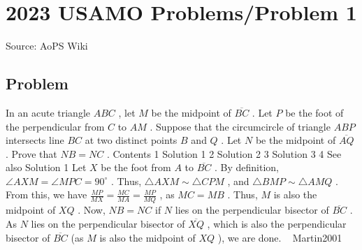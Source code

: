 \documentclass[12pt]{article}
\begin{document}
\section*{{2023 USAMO Problems/Problem 1}}
Source: AoPS Wiki

\subsection*{Problem}
In an acute triangle $ABC$ , let $M$ be the midpoint of $\overline{BC}$ . Let $P$ be the foot of the perpendicular from $C$ to $AM$ . Suppose that the circumcircle of triangle $ABP$ intersects line $BC$ at two distinct points $B$ and $Q$ . Let $N$ be the midpoint of $\overline{AQ}$ . Prove that $NB=NC$ . Contents 1 Solution 1 2 Solution 2 3 Solution 3 4 See also Solution 1 Let $X$ be the foot from $A$ to $\overline{BC}$ . By definition, $\angle AXM = \angle MPC = 90^{\circ}$ . Thus, $\triangle AXM \sim \triangle CPM$ , and $\triangle BMP \sim \triangle AMQ$ . From this, we have $\frac{MP}{MX} = \frac{MC}{MA} = \frac{MP}{MQ}$ , as $MC=MB$ . Thus, $M$ is also the midpoint of $XQ$ . Now, $NB = NC$ if $N$ lies on the perpendicular bisector of $\overline{BC}$ . As $N$ lies on the perpendicular bisector of $\overline{XQ}$ , which is also the perpendicular bisector of $\overline{BC}$ (as $M$ is also the midpoint of $XQ$ ), we are done.
~ Martin2001
\end{document}
